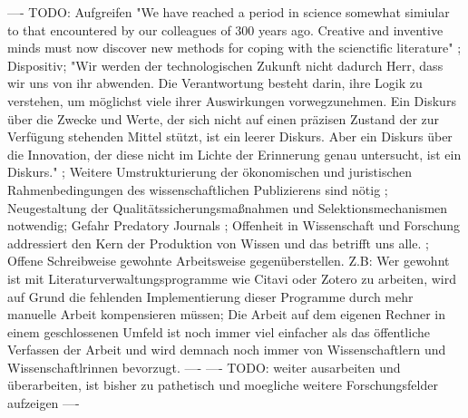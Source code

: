 ---- TODO: Aufgreifen "We have reached a period in science somewhat simiular to that encountered by our colleagues of 300 years ago. Creative and inventive minds must now discover new methods for coping with the scienctific literature" \cite{porter_1964_scientific}; Dispositiv; "Wir werden der technologischen Zukunft nicht dadurch Herr, dass wir uns von ihr abwenden. Die Verantwortung besteht darin, ihre Logik zu verstehen, um möglichst viele ihrer Auswirkungen vorwegzunehmen. Ein Diskurs über die Zwecke und Werte, der sich nicht auf einen präzisen Zustand der zur Verfügung stehenden Mittel stützt, ist ein leerer Diskurs. Aber ein Diskurs über die Innovation, der diese nicht im Lichte der Erinnerung genau untersucht, ist ein Diskurs." \cite{naeder_2010_open}; Weitere Umstrukturierung der ökonomischen und juristischen Rahmenbedingungen des wissenschaftlichen Publizierens sind nötig \cite{naeder_2010_open};  Neugestaltung der Qualitätssicherungsmaßnahmen und Selektionsmechanismen notwendig; Gefahr Predatory Journals \cite{Beall_2012}; Offenheit in Wissenschaft und Forschung addressiert den Kern der Produktion von Wissen und das betrifft uns alle. \cite{Mussell_2013}; Offene Schreibweise gewohnte Arbeitsweise gegenüberstellen. Z.B: Wer gewohnt ist mit Literaturverwaltungsprogramme wie Citavi oder Zotero zu arbeiten, wird auf Grund die fehlenden Implementierung dieser Programme  durch mehr manuelle Arbeit kompensieren müssen; Die Arbeit auf dem eigenen Rechner in einem geschlossenen Umfeld ist noch immer viel einfacher als das öffentliche Verfassen der Arbeit und wird demnach noch immer von Wissenschaftlern und Wissenschaftlrinnen bevorzugt. ----
---- TODO: weiter ausarbeiten und überarbeiten, ist bisher zu pathetisch und moegliche weitere Forschungsfelder aufzeigen ----
